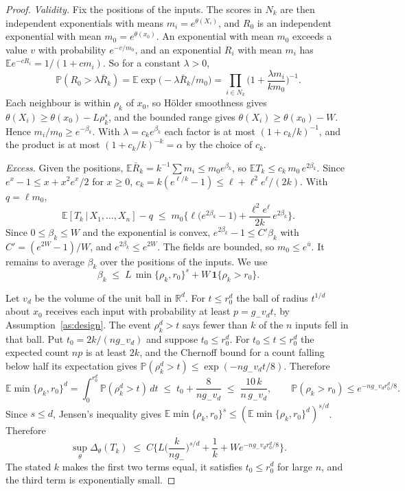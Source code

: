 \documentclass[11pt]{article}
\theoremstyle{definition}
\theoremstyle{remark}
\newcommand{\R}{\mathbb{R}}
\newcommand{\E}{\mathbb{E}}
\newcommand{\Prob}{\mathbb{P}}
\newcommand{\given}{\,|\,}
\begin{document}
\begin{proof}
\emph{Validity.} Fix the positions of the inputs. The scores in $N_k$ are then independent
exponentials with means $m_i=e^{\theta(X_i)}$, and $R_0$ is an independent exponential with
mean $m_0=e^{\theta(x_0)}$. An exponential with mean $m_0$ exceeds a value $v$ with
probability $e^{-v/m_0}$, and an exponential $R_i$ with mean $m_i$ has
$\E e^{-cR_i}=1/(1+cm_i)$. So for a constant $\lambda>0$,
\[
  \Prob(R_0>\lambda\bar R_k)=\E\exp\!\big(-\lambda\bar R_k/m_0\big)
  =\prod_{i\in N_k}\Big(1+\frac{\lambda m_i}{km_0}\Big)^{-1}.
\]
Each neighbour is within $\rho_k$ of $x_0$, so H\"older smoothness gives
$\theta(X_i)\ge\theta(x_0)-L\rho_k^s$, and the bounded range gives
$\theta(X_i)\ge\theta(x_0)-W$. Hence $m_i/m_0\ge e^{-\beta_k}$. With
$\lambda=c_ke^{\beta_k}$ each factor is at most $(1+c_k/k)^{-1}$, and the product is at
most $(1+c_k/k)^{-k}=\alpha$ by the choice of $c_k$.

\emph{Excess.} Given the positions, $\E\bar R_k=k^{-1}\sum m_i\le m_0e^{\beta_k}$, so
$\E T_k\le c_k\,m_0\,e^{2\beta_k}$. Since $e^x-1\le x+x^2e^x/2$ for $x\ge0$,
$c_k=k(e^{\ell/k}-1)\le\ell+\ell^2e^{\ell}/(2k)$. With $q=\ell m_0$,
\[
  \E[T_k\given X_1,\dots,X_n]-q\;\le\;
  m_0\Big\{\ell\big(e^{2\beta_k}-1\big)+\frac{\ell^2e^{\ell}}{2k}\,e^{2\beta_k}\Big\}.
\]
Since $0\le\beta_k\le W$ and the exponential is convex,
$e^{2\beta_k}-1\le C'\beta_k$ with $C'=(e^{2W}-1)/W$, and $e^{2\beta_k}\le e^{2W}$. The
fields are bounded, so $m_0\le e^{\overline u}$. It remains to average $\beta_k$ over the
positions of the inputs. We use
\[
  \beta_k\;\le\;L\,\min\{\rho_k,r_0\}^{s}+W\,\mathbf 1\{\rho_k>r_0\}.
\]

Let $v_d$ be the volume of the unit ball in $\R^d$. For $t\le r_0^d$ the ball of radius
$t^{1/d}$ about $x_0$ receives each input with probability at least $p=g_-v_dt$, by
Assumption~\ref{as:design}. The event $\rho_k^d>t$ says fewer than $k$ of the $n$ inputs
fell in that ball. Put $t_0=2k/(ng_-v_d)$ and suppose $t_0\le r_0^d$. For
$t_0\le t\le r_0^d$ the expected count $np$ is at least $2k$, and the Chernoff bound for a
count falling below half its expectation gives
$\Prob(\rho_k^d>t)\le\exp(-ng_-v_dt/8)$. Therefore
\[
  \E\min\{\rho_k,r_0\}^d=\int_0^{r_0^d}\Prob(\rho_k^d>t)\,dt
  \;\le\;t_0+\frac{8}{ng_-v_d}\;\le\;\frac{10\,k}{n\,g_-v_d},
  \qquad
  \Prob(\rho_k>r_0)\le e^{-ng_-v_dr_0^d/8}.
\]
Since $s\le d$, Jensen's inequality gives
$\E\min\{\rho_k,r_0\}^s\le(\E\min\{\rho_k,r_0\}^d)^{s/d}$. Therefore
\[
  \sup_\theta\Delta_\theta(T_k)\;\le\;
  C\Big\{L\Big(\frac{k}{ng_-}\Big)^{s/d}+\frac1k+W e^{-ng_-v_dr_0^d/8}\Big\}.
\]
The stated $k$ makes the first two terms equal, it satisfies $t_0\le r_0^d$ for large $n$,
and the third term is exponentially small.
\end{proof}
\end{document}
